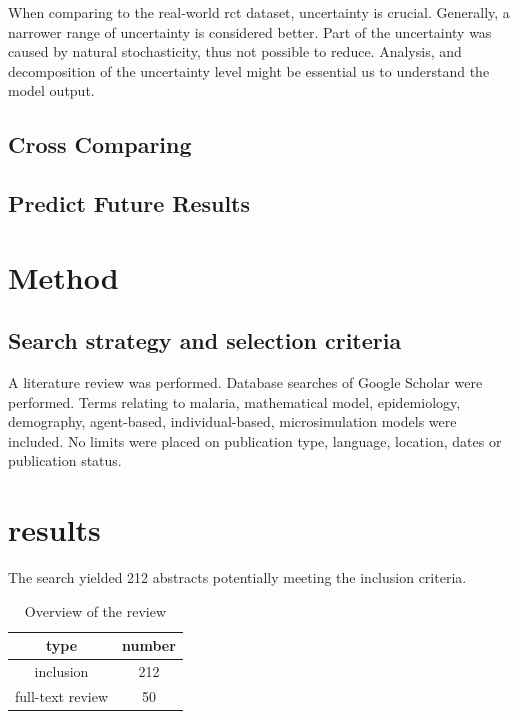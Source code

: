 \documentclass[a4paper, 12pt, twoside]{article}
\begin{document}
When comparing to the real-world \gls{rct} dataset, uncertainty is crucial.
Generally, a narrower range of uncertainty is considered better.
Part of the uncertainty was caused by natural stochasticity, thus not possible to reduce.
Analysis, and decomposition of the uncertainty level might be essential us to understand the model output.

\subsection{Cross Comparing}

\subsection{Predict Future Results}

\section{Method}%
\label{sec:method}
\subsection{Search strategy and selection criteria}
A literature review was performed.
Database searches of Google Scholar were performed.
Terms relating to malaria, mathematical model, epidemiology, demography, agent-based, individual-based, microsimulation models were included. No limits were placed on publication type, language, location, dates or publication status.

\section{results}%
\label{sec:results}
The search yielded 212 abstracts potentially meeting the inclusion criteria.

\begin{table}
	\centering
	\label{tab:overview_of_the_review}
	\begin{tabular}{c S}
		\toprule
		type             & {number} \\
		\midrule
		inclusion        & 212      \\
		full-text review & 50       \\
		\bottomrule
	\end{tabular}
	\caption{Overview of the review}
\end{table}

\appendix
\printglossaries
\printnomenclature


\end{document}
